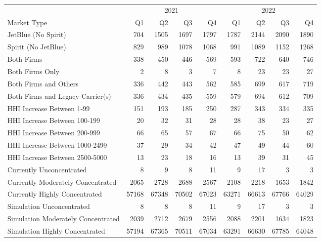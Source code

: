 
\begin{tabular}{lrrrrrrrr}
\toprule
\multicolumn{1}{c}{ } & \multicolumn{4}{c}{2021} & \multicolumn{4}{c}{2022} \\
\cmidrule(l{3pt}r{3pt}){2-5} \cmidrule(l{3pt}r{3pt}){6-9}
Market Type & Q1 & Q2 & Q3 & Q4 & Q1 & Q2 & Q3 & Q4\\
\midrule
JetBlue (No Spirit) & 704 & 1505 & 1697 & 1797 & 1787 & 2144 & 2090 & 1890\\
Spirit (No JetBlue) & 829 & 989 & 1078 & 1068 & 991 & 1089 & 1152 & 1268\\
Both Firms & 338 & 450 & 446 & 569 & 593 & 722 & 640 & 746\\
Both Firms Only & 2 & 8 & 3 & 7 & 8 & 23 & 23 & 27\\
Both Firms and Others & 336 & 442 & 443 & 562 & 585 & 699 & 617 & 719\\
Both Firms and Legacy Carrier(s) & 336 & 434 & 435 & 559 & 579 & 694 & 612 & 709\\
HHI Increase Between 1-99 & 151 & 193 & 185 & 250 & 287 & 343 & 334 & 335\\
HHI Increase Between 100-199 & 20 & 32 & 31 & 28 & 28 & 38 & 23 & 27\\
HHI Increase Between 200-999 & 66 & 65 & 57 & 67 & 66 & 75 & 50 & 62\\
HHI Increase Between 1000-2499 & 37 & 29 & 34 & 42 & 47 & 49 & 44 & 60\\
HHI Increase Between 2500-5000 & 13 & 23 & 18 & 16 & 13 & 39 & 31 & 45\\
Currently Unconcentrated & 8 & 9 & 8 & 11 & 9 & 17 & 3 & 3\\
Currently Moderately Concentrated & 2065 & 2728 & 2688 & 2567 & 2108 & 2218 & 1653 & 1842\\
Currently Highly Concentrated & 57168 & 67348 & 70502 & 67023 & 63271 & 66613 & 67766 & 64029\\
Simulation Unconcentrated & 8 & 8 & 8 & 11 & 9 & 17 & 3 & 3\\
Simulation Moderately Concentrated & 2039 & 2712 & 2679 & 2556 & 2088 & 2201 & 1634 & 1823\\
Simulation Highly Concentrated & 57194 & 67365 & 70511 & 67034 & 63291 & 66630 & 67785 & 64048\\
\bottomrule
\end{tabular}
